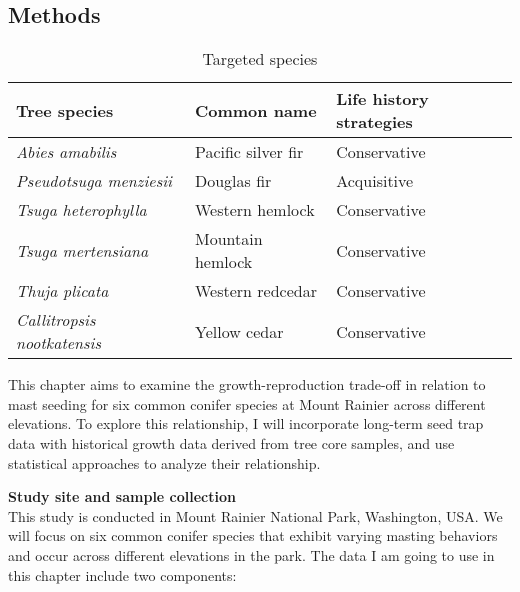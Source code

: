\documentclass[11pt,letter]{article}
\begin{document}
\subsection{Methods}
\begin{table}[htb]
	\centering
	\small
	\caption{Targeted species}
\begin{tabular}{|p{5cm}|p{5cm}|p{5cm}|}
\hline
 Tree species & Common name & Life history strategies\\ \hline %
\textit{Abies amabilis} & Pacific silver fir & Conservative \\ \hline
\textit{Pseudotsuga menziesii} & Douglas fir & Acquisitive    \\\hline
\textit{Tsuga heterophylla} & Western hemlock & Conservative    \\\hline
\textit{Tsuga mertensiana} & Mountain hemlock & Conservative    \\\hline
\textit{Thuja plicata} & Western redcedar & Conservative    \\\hline
\textit{Callitropsis nootkatensis} & Yellow cedar & Conservative    \\\hline
\end{tabular}
\end{table}
This chapter aims to examine the growth-reproduction trade-off in relation to mast seeding for six common conifer species at Mount Rainier across different elevations. To explore this relationship, I will incorporate long-term seed trap data with historical growth data derived from tree core samples, and use statistical approaches to analyze their relationship.\par
\textbf{Study site and sample collection}\\
This study is conducted in Mount Rainier National Park, Washington, USA. We will focus on six common conifer species that exhibit varying masting behaviors and occur across different elevations in the park. The data I am going to use in this chapter include two components:
\end{document}
